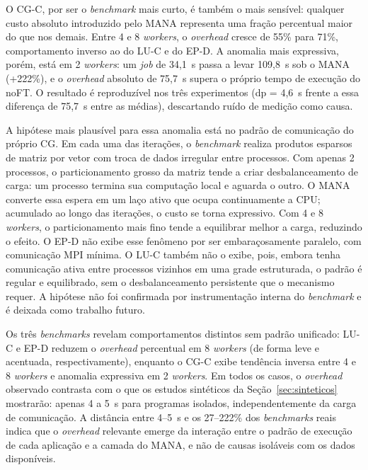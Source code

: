 O CG-C, por ser o \textit{benchmark} mais curto, é também o mais sensível:
qualquer custo absoluto introduzido pelo MANA representa uma fração percentual
maior do que nos demais. Entre 4 e 8 \textit{workers}, o \textit{overhead} cresce
de 55\% para 71\%, comportamento inverso ao do LU-C e do EP-D. A anomalia mais
expressiva, porém, está em 2 \textit{workers}: um \textit{job} de 34,1~s passa a
levar 109,8~s sob o MANA (+222\%), e o \textit{overhead} absoluto de 75,7~s supera
o próprio tempo de execução do noFT. O resultado é reproduzível nos três
experimentos (dp = 4,6~s frente a essa diferença de 75,7~s entre as médias),
descartando ruído de medição como causa.

A hipótese mais plausível para essa anomalia está no padrão de comunicação do
próprio CG. Em cada uma das iterações, o \textit{benchmark} realiza produtos
esparsos de matriz por vetor com troca de dados irregular entre processos. Com
apenas 2 processos, o particionamento grosso da matriz tende a criar desbalanceamento
de carga: um processo termina sua computação local e aguarda o outro. O MANA converte
essa espera em um laço ativo que ocupa continuamente a CPU; acumulado ao longo das
iterações, o custo se torna expressivo. Com 4 e 8 \textit{workers}, o particionamento
mais fino tende a equilibrar melhor a carga, reduzindo o efeito. O EP-D não exibe
esse fenômeno por ser embaraçosamente paralelo, com comunicação MPI mínima. O LU-C
também não o exibe, pois, embora tenha comunicação ativa entre processos vizinhos
em uma grade estruturada, o padrão é regular e equilibrado, sem o desbalanceamento
persistente que o mecanismo requer. A hipótese não foi confirmada por instrumentação
interna do \textit{benchmark} e é deixada como trabalho futuro.

\label{sec:gap-overhead}%
Os três \textit{benchmarks} revelam comportamentos distintos sem padrão unificado:
LU-C e EP-D reduzem o \textit{overhead} percentual em 8 \textit{workers} (de forma
leve e acentuada, respectivamente), enquanto o CG-C exibe tendência inversa entre
4 e 8 \textit{workers} e anomalia expressiva em 2 \textit{workers}. Em todos os
casos, o \textit{overhead} observado contrasta com o que os estudos sintéticos da
Seção~\ref{sec:sinteticos} mostrarão: apenas 4 a 5~s para programas isolados,
independentemente da carga de comunicação. A distância entre 4--5~s e os 27--222\%
dos \textit{benchmarks} reais indica que o \textit{overhead} relevante emerge da
interação entre o padrão de execução de cada aplicação e a camada do MANA, e não
de causas isoláveis com os dados disponíveis.

